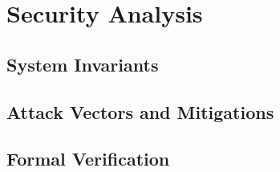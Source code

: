 \section{Security Analysis}\label{sec:security}


\subsection{System Invariants}

\subsection{Attack Vectors and Mitigations}

\subsection{Formal Verification}
